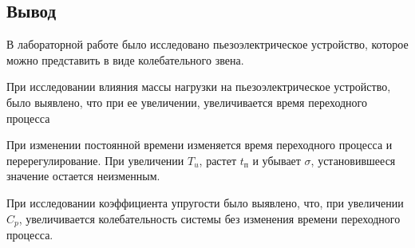 \documentclass[a4paper, 12pt]{article}
\begin{document}
\begin{center}
	\section*{Вывод}
\end{center}\par
В лабораторной работе было исследовано пьезоэлектрическое устройство, которое можно представить в виде колебательного звена.\par
При исследовании влияния массы нагрузки на пьезоэлектрическое устройство, было выявлено, что при ее увеличении, увеличивается время переходного процесса\par
При изменении постоянной времени изменяется время переходного процесса и перерегулирование. При увеличении $T_u$, растет $t_\text{п}$ и убывает $\sigma$, установившееся значение остается неизменным.\par
При исследовании коэффициента упругости было выявлено, что, при увеличении $C_p$, увеличивается колебательность системы без изменения времени переходного процесса.
\end{document}
